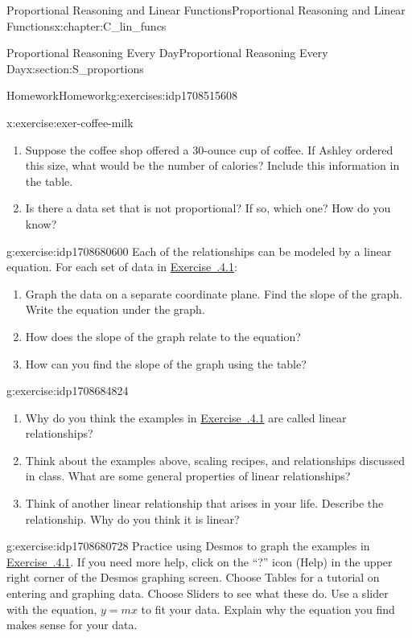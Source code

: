 \documentclass[oneside,10pt,]{book}
\newcommand{\xreffont}{\relax}
\numberwithin{equation}{chapter}
\begin{document}
\begin{chapterptx}{Proportional Reasoning and Linear Functions}{}{Proportional Reasoning and Linear Functions}{}{}{x:chapter:C_lin_funcs}
\begin{sectionptx}{Proportional Reasoning Every Day}{}{Proportional Reasoning Every Day}{}{}{x:section:S_proportions}
\begin{exercises-subsection}{Homework}{}{Homework}{}{}{g:exercises:idp1708515608}
\begin{divisionexercise}{7}{}{}{x:exercise:exer-coffee-milk}
\begin{enumerate}[font=\bfseries,label=(\alph*),ref=\alph*]
\item{}Suppose the coffee shop offered a 30-ounce cup of coffee. If Ashley ordered this size, what would be the number of calories? Include this information in the table.%
\item{}Is there a data set that is not proportional? If so, which one? How do you know?%
\end{enumerate}
\end{divisionexercise}%
\begin{divisionexercise}{8}{}{}{g:exercise:idp1708680600}%
Each of the relationships can be modeled by a linear equation. For each set of data in \hyperlink{x:exercise:exer-walk-cycle}{Exercise~{\xreffont 2.5.4.1}\textendash{}{\xreffont 2.5.4.7}}:%
\begin{enumerate}[font=\bfseries,label=(\alph*),ref=\alph*]
\item{}Graph the data on a separate coordinate plane. Find the slope of the graph. Write the equation under the graph.%
\item{}How does the slope of the graph relate to the equation?%
\item{}How can you find the slope of the graph using the table?%
\end{enumerate}
\end{divisionexercise}%
\begin{divisionexercise}{9}{}{}{g:exercise:idp1708684824}%
\begin{enumerate}[font=\bfseries,label=(\alph*),ref=\alph*]
\item{}Why do you think the examples in \hyperlink{x:exercise:exer-walk-cycle}{Exercise~{\xreffont 2.5.4.1}\textendash{}{\xreffont 2.5.4.7}} are called linear relationships?%
\item{}Think about the examples above, scaling recipes, and relationships discussed in class. What are some general properties of linear relationships?%
\item{}Think of another linear relationship that arises in your life. Describe the relationship. Why do you think it is linear?%
\end{enumerate}
\end{divisionexercise}%
\begin{divisionexercise}{10}{}{}{g:exercise:idp1708680728}%
Practice using Desmos to graph the examples in \hyperlink{x:exercise:exer-walk-cycle}{Exercise~{\xreffont 2.5.4.1}\textendash{}{\xreffont 2.5.4.7}}. If you need more help, click on the ``?'' icon (Help) in the upper right corner of the Desmos graphing screen. Choose Tables for a tutorial on entering and graphing data. Choose Sliders to see what these do. Use a slider with the equation, \(y = mx\) to fit your data. Explain why the equation you find makes sense for your data.%

\end{divisionexercise}
\end{exercises-subsection}
\end{sectionptx}
\end{chapterptx}
\end{document}
